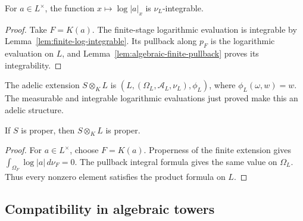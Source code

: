 \begin{proposition}\label{prop:algebraic-log-integrable}
\leanok
{}
For $a\in L^\times$, the function $x\mapsto\log|a|_x$ is
$\nu_L$-integrable.
\end{proposition}
\begin{proof}
Take $F=K(a)$. The finite-stage logarithmic evaluation is integrable
by Lemma~\ref{lem:finite-log-integrable}. Its pullback along $p_F$
is the logarithmic evaluation on $L$, and
Lemma~\ref{lem:algebraic-finite-pullback} proves its integrability.
\end{proof}

\begin{definition}\label{def:algebraic-extension}
\leanok
{}
The adelic extension $S\otimes_K L$ is
$(L,(\Omega_L,\mathcal A_L,\nu_L),\phi_L)$, where $\phi_L(\omega,w)=w$.
The measurable and integrable logarithmic evaluations just proved
make this an adelic structure.
\end{definition}

\begin{proposition}\label{prop:algebraic-proper}
\leanok
{}
If $S$ is proper, then $S\otimes_K L$ is proper.
\end{proposition}
\begin{proof}
For $a\in L^\times$, choose $F=K(a)$. Properness of the finite
extension gives $\int_{\Omega_F}\log|a|\,d\nu_F=0$.
The pullback integral formula gives the same value on $\Omega_L$.
Thus every nonzero element satisfies the product formula on $L$.
\end{proof}

\subsection{Compatibility in algebraic towers}

